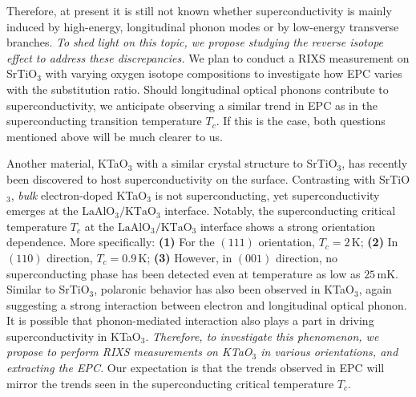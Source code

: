 \documentclass[11pt]{article}
\begin{document}
Therefore, at present it is still not known whether superconductivity is mainly induced by high-energy, longitudinal phonon modes or by low-energy transverse branches.
\textit{To shed light on this topic, we propose studying the reverse isotope effect to address these discrepancies.} We plan to conduct a RIXS measurement on SrTiO$_{3}$ with varying oxygen isotope compositions to investigate how EPC varies with the substitution ratio.  Should longitudinal optical phonons contribute to superconductivity, we anticipate observing a similar trend in EPC as in the superconducting transition temperature $T_{c}$. If this is the case, both questions mentioned above will be much clearer to us. 

Another material, KTaO$_{3}$ with a similar crystal structure to SrTiO$_{3}$, has recently been discovered to host superconductivity on the surface\cite{ren_two-dimensional_2022}. 
Contrasting with SrTiO$_{3}$, \textit{bulk}  electron-doped KTaO$_{3}$ is not superconducting, yet superconductivity emerges at the $\mathrm{LaAlO_{3}/KTaO_{3}}$ interface\cite{ren_two-dimensional_2022,chen_two-dimensional_2021}. 
Notably, the superconducting critical temperature $T_c$ at the $\mathrm{LaAlO_{3}/KTaO_{3}}$ interface shows a strong orientation dependence\cite{ren_two-dimensional_2022,chen_two-dimensional_2021}. 
More specifically: 
\textbf{(1)} For the $(111)$ orientation, $T_{c} = 2\,\mathrm{K}$\cite{ren_two-dimensional_2022};
\textbf{(2)} In $(110)$ direction, $T_{c} = 0.9\,\mathrm{K}$\cite{chen_two-dimensional_2021};
\textbf{(3)} However, in $(001)$ direction, no superconducting phase has been detected even at temperature as low as $25\,\mathrm{mK}$\cite{ren_two-dimensional_2022}. 
Similar to SrTiO$_{3}$\cite{swartz_polaronic_2018}, polaronic behavior has also been observed in KTaO$_{3}$, again suggesting a strong interaction between electron and longitudinal optical phonon\cite{chen_orientation-dependent_2023}. 
It is possible that phonon-mediated interaction also plays a part in driving superconductivity in KTaO$_{3}$. 
\textit{Therefore, to investigate this phenomenon, we propose to perform RIXS measurements on KTaO$_{3}$ in various orientations, and extracting the EPC.}
Our expectation is that the trends observed in EPC will mirror the trends seen in the superconducting critical temperature $T_c$. 
\end{document}
